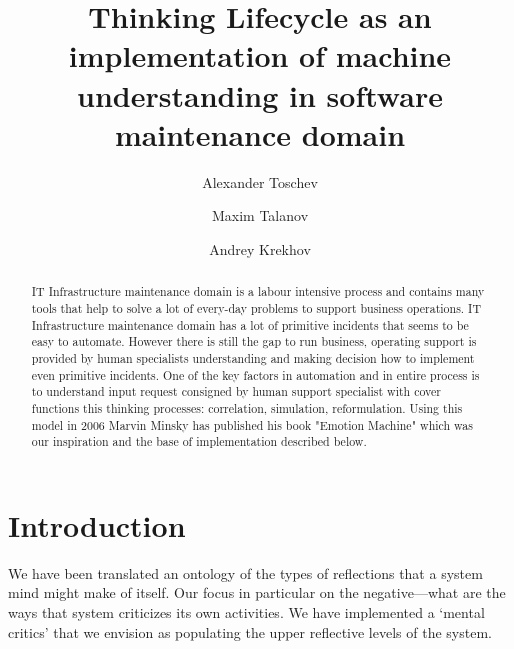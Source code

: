 \documentclass[runningheads,a4paper]{llncs}
\begin{document}
\mainmatter

\title{Thinking Lifecycle as an implementation of machine understanding in software maintenance domain}


\author{Alexander Toschev \and Maxim Talanov \and Andrey Krekhov}


\maketitle

\begin{abstract}
IT Infrastructure maintenance domain is a labour intensive process and contains many tools that help to solve a lot of every-day problems to support business operations. IT Infrastructure maintenance domain has a lot of primitive incidents that seems to be easy to automate. However there is still the gap to run business, operating support is provided by human specialists understanding and making decision how to implement even primitive incidents. One of the key factors in automation and in entire process is to understand input request consigned by human support specialist with cover functions this thinking processes:  correlation, simulation, reformulation. Using this model in 2006 Marvin Minsky has published his book "Emotion Machine" \cite{mmem} which was our inspiration and the base of implementation described below.


\end{abstract}

\section{Introduction}
We have been translated an ontology of the types of reflections that a system mind might make of itself. Our focus in particular on the negative—what are the ways that system criticizes its own activities.  We have implemented a ‘mental critics’ that we envision as populating the upper reflective levels of the system. 
\end{document}

